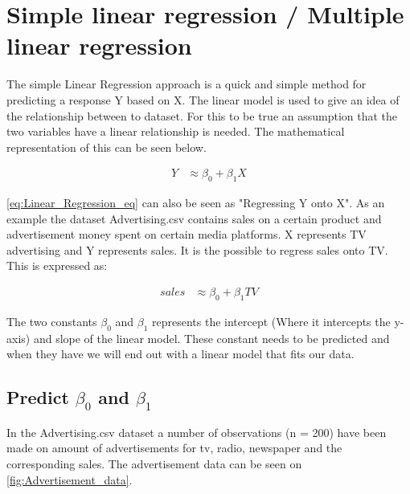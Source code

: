 \graphicspath{{Chapters/Indledning/}}

\chapter{Simple linear regression / Multiple linear regression}

The simple Linear Regression approach is a quick and simple method for predicting a response Y based on X. The linear model is used to give an idea of the relationship between to dataset. For this to be true an assumption that the two variables have a linear relationship is needed. The mathematical representation of this can be seen below.

\begin{equation} \label{eq:Linear_Regression_eq}
	\begin{split}
		Y & \approx \beta_0 + \beta_1 X
	\end{split}
\end{equation} 

\cref{eq:Linear_Regression_eq} can also be seen as "Regressing Y onto X". As an example the dataset Advertising.csv contains sales on a certain product and advertisement money spent on certain media platforms. X represents TV advertising and Y represents sales. It is the possible to regress sales onto TV. This is expressed as:

\begin{equation} \label{eq:Linear_Regression_eq_sales}
\begin{split}
sales & \approx \beta_0 + \beta_1 TV
\end{split}
\end{equation} 


The two constants $\beta_0$ and $\beta_1$ represents the intercept (Where it intercepts the y-axis) and slope of the linear model. These constant needs to be predicted and when they have we will end out with a linear model that fits our data.

\section{Predict $\beta_0$ and $\beta_1$}
In the Advertising.csv dataset a number of observations (n = 200) have been made on amount of advertisements for tv, radio, newspaper and the corresponding sales. The advertisement data can be seen on \cref{fig:Advertisement_data}.

